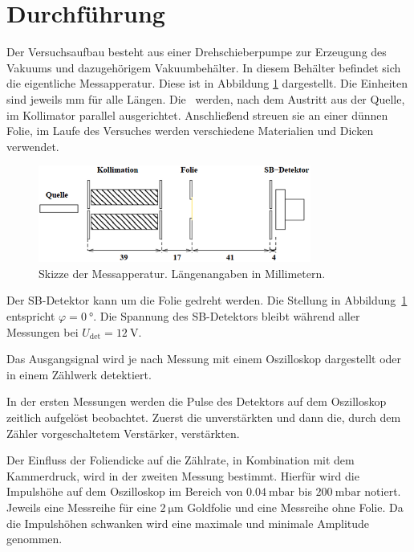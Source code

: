 \section{Durchführung}
\label{sec:Durchführung}

Der Versuchsaufbau besteht aus einer Drehschieberpumpe zur Erzeugung des Vakuums und dazugehörigem Vakuumbehälter.
In diesem Behälter befindet sich die eigentliche Messapperatur.
Diese ist in Abbildung \ref{fig:aufbau} dargestellt.
Die Einheiten sind jeweils $\si{\milli\meter}$ für alle Längen.
Die \alphat~werden, nach dem Austritt aus der Quelle, im Kollimator parallel ausgerichtet.
Anschließend streuen sie an einer dünnen Folie, im Laufe des Versuches werden verschiedene Materialien und Dicken verwendet.

\begin{figure}[ht]
  \centering
  \includegraphics[width=0.8\textwidth]{images/aufbau.png}
  \caption{Skizze der Messapperatur. Längenangaben in Millimetern. \cite{anleitung}}
  \label{fig:aufbau}
\end{figure}

Der SB-Detektor kann um die Folie gedreht werden.
Die Stellung in Abbildung~\ref{fig:aufbau} entspricht $φ=\SI{0}{\degree}$.
Die Spannung des SB-Detektors bleibt während aller Messungen bei
$U_\text{det} = \SI{12}{\volt}$.

Das Ausgangsignal wird je nach Messung mit einem Oszilloskop dargestellt oder in einem Zählwerk detektiert.

In der ersten Messungen werden die Pulse des Detektors auf dem Oszilloskop zeitlich aufgelöst beobachtet.
Zuerst die unverstärkten und dann die, durch dem Zähler vorgeschaltetem Verstärker, verstärkten.

Der Einfluss der Foliendicke auf die Zählrate, in Kombination mit dem Kammerdruck, wird in der zweiten Messung bestimmt.
Hierfür wird die Impulshöhe auf dem Oszilloskop im Bereich von $\SI{0.04}{\milli\bar}$ bis $\SI{200}{\milli\bar}$ notiert.
Jeweils eine Messreihe für eine $\SI{2}{\micro\meter}$ Goldfolie und eine Messreihe ohne Folie.
Da die Impulshöhen schwanken wird eine maximale und minimale Amplitude genommen.

